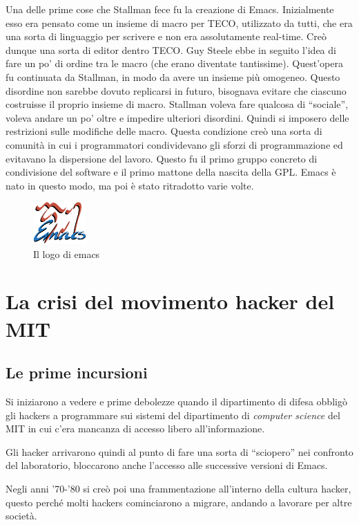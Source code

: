 Una delle prime cose che Stallman fece fu la creazione di Emacs. 
Inizialmente esso era pensato come un insieme di macro per TECO, utilizzato da tutti, che era una sorta di linguaggio per scrivere e non era assolutamente real-time. 
Creò dunque una sorta di editor dentro TECO.  Guy Steele ebbe in seguito l'idea di fare un po' di ordine tra le macro (che erano diventate tantissime). 
Quest'opera fu continuata da Stallman, in modo da avere un insieme più omogeneo. Questo disordine non sarebbe dovuto replicarsi in futuro, bisognava evitare che ciascuno costruisse il proprio insieme di macro. Stallman voleva fare qualcosa di ``sociale'', voleva andare un po' oltre e impedire ulteriori disordini. Quindi si imposero delle restrizioni sulle modifiche delle macro. Questa condizione creò una sorta di comunità in cui i programmatori condividevano gli sforzi di programmazione ed evitavano la dispersione del lavoro. Questo fu il primo gruppo concreto di condivisione del software e il primo mattone della nascita della GPL. Emacs è nato in questo modo, ma poi è stato ritradotto varie volte.

\begin{figure}[htbp]
	\centering
	\includegraphics[width=20mm]{images/emacs.png}
	\caption{Il logo di emacs}
\end{figure}

\section{La crisi del movimento hacker del MIT}

\subsection{Le prime incursioni}

Si iniziarono a vedere e prime debolezze quando il dipartimento di difesa obbligò gli hackers a programmare sui sistemi del dipartimento di \textit{computer science} del MIT in cui c'era mancanza di accesso libero all'informazione. 

Gli hacker arrivarono quindi al punto di fare una sorta di ``sciopero'' nei confronto del laboratorio, bloccarono anche l'accesso alle successive versioni di Emacs. 

Negli anni '70-'80 si creò poi una frammentazione all'interno della cultura hacker, questo perché molti hackers cominciarono a migrare, andando a lavorare per altre società.

